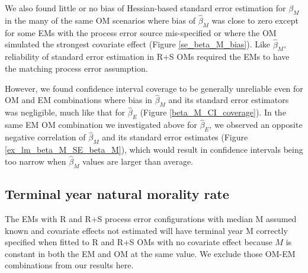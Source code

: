 \documentclass[
  12pt,
]{article}
\begin{document}
We also found little or no bias of Hessian-based standard error estimation for \(\beta_M\) in the many of the same OM scenarios where bias of \(\widehat \beta_M\) was close to zero except for some EMs with the process error source mis-specified or where the OM simulated the strongest covariate effect (Figure \ref{se_beta_M_bias}). Like \(\widehat \beta_M\), reliability of standard error estimation in R+S OMs required the EMs to have the matching process error assumption.

However, we found confidence interval coverage to be generally unreliable even for OM and EM combinations where bias in \(\widehat \beta_M\) and its standard error estimators was negligible, much like that for \(\widehat \beta_E\) (Figure \ref{beta_M_CI_coverage}). In the same EM OM combination we investigated above for \(\widehat \beta_E\), we observed an opposite negative correlation of \(\widehat \beta_M\) and its standard error estimates (Figure \ref{ex_lm_beta_M_SE_beta_M}), which would result in confidence intervals being too narrow when \(\widehat \beta_M\) values are larger than average.

\hypertarget{terminal-year-natural-morality-rate}{%
\subsection*{Terminal year natural morality rate}\label{terminal-year-natural-morality-rate}}

The EMs with R and R+S process error configurations with median M assumed known and covariate effects not estimated will have terminal year M correctly specified when fitted to R and R+S OMs with no covariate effect because \(M\) is constant in both the EM and OM at the same value. We exclude those OM-EM combinations from our results here.
\end{document}

